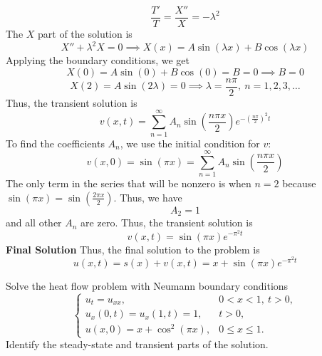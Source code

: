 \documentclass[12pt]{article}
\begin{document}
\[
\frac{T'}{T} = \frac{X''}{X} = -\lambda^2
\]
The $X$ part of the solution is
\[
X'' + \lambda^2 X = 0
\implies X(x) = A \sin(\lambda x) + B \cos(\lambda x)
\]
Applying the boundary conditions, we get
\[
X(0) = A \sin(0) + B \cos(0) = B = 0 \implies B = 0
\]
\[
X(2) = A \sin(2\lambda) = 0 \implies \lambda = \frac{n\pi}{2}, \ n = 1,2,3,\dots
\]
Thus, the transient solution is
\[
v(x,t) = \sum_{n=1}^{\infty} A_n \sin\left(\frac{n\pi x}{2}\right) e^{-\left(\frac{n\pi}{2}\right)^2 t}
\]
To find the coefficients $A_n$, we use the initial condition for $v$:
\[
v(x,0) = \sin(\pi x) = \sum_{n=1}^{\infty} A_n \sin\left(\frac{n\pi x}{2}\right)
\]
The only term in the series that will be nonzero is when $n=2$ because $\sin(\pi x) = \sin\left(\frac{2\pi x}{2}\right)$. Thus, we have
\[
A_2 = 1
\]
and all other $A_n$ are zero. Thus, the transient solution is
\[
v(x,t) = \sin(\pi x) e^{-\pi^2 t}
\]
\textbf{Final Solution}
Thus, the final solution to the problem is
\[
\boxed{
u(x,t) = s(x) + v(x,t) = x + \sin(\pi x) e^{-\pi^2 t}
}
\]

Solve the heat flow problem with Neumann boundary conditions
\[
\begin{cases}
u_t = u_{xx}, & 0 < x < 1,\ t > 0, \\
u_x(0,t) = u_x(1,t) = 1, & t > 0, \\
u(x,0) = x + \cos^2(\pi x), & 0 \leq x \leq 1.
\end{cases}
\]
Identify the steady-state and transient parts of the solution.
\end{document}
